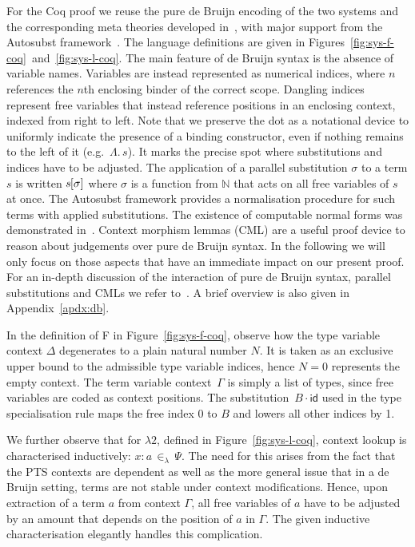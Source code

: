 \documentclass[a4paper,UKenglish]{lipics-v2016}
\newcommand{\ms}{\,}
\newcommand{\mrel}[1]{\mathrel{\ms #1 \ms}}
\newcommand{\Nat}{\mathbb{N}}
\newcommand{\SysL}{$\lambda2$\xspace}
\newcommand{\of}{\ensuremath{\!:\!}}
\newcommand{\inL}{\mrel{\in_{\lambda}}}
\newcommand{\TyLam}{\ensuremath{\Lambda.\,}}
\newcommand{\subst}[1]{\hphantom{|}\!\![{#1}]}
\newcommand{\scons}{\mathbin{\cdot}}
\newcommand{\id}{\mathsf{id}}
\theoremstyle{plain}
\begin{document}
For the Coq proof we reuse the pure de Bruijn encoding of the two systems and the corresponding meta theories developed in~\cite{KaiserEtAl:2017:sysf_pts_equiv_coq}, with major support from the Autosubst framework~\cite{DBLP:conf/itp/SchaferTS15}.
The language definitions are given in Figures~\ref{fig:sys-f-coq}~and~\ref{fig:sys-l-coq}.
The main feature of de Bruijn syntax is the absence of variable names.
Variables are instead represented as numerical indices, where $n$ references the $n$th enclosing binder of the correct scope.
Dangling indices represent free variables that instead reference positions in an enclosing context, indexed from right to left.
Note that we preserve the dot as a notational device to uniformly indicate the presence of a binding constructor, even if nothing remains to the left of it (e.g.\ $\TyLam s$).
It marks the precise spot where substitutions and indices have to be adjusted.
The application of a parallel substitution $\sigma$ to a term $s$ is written $s\subst{\sigma}$ where $\sigma$ is a function from $\Nat$ that acts on all free variables of $s$ at once.
The Autosubst framework provides a normalisation procedure for such terms with applied substitutions.
The existence of computable normal forms was demonstrated in~\cite{SchaeferEtAl:2009:Completeness}.
Context morphism lemmas (CML) are a useful proof device to reason about judgements over pure de Bruijn syntax.
In the following we will only focus on those aspects that have an immediate impact on our present proof.
For an in-depth discussion of the interaction of pure de Bruijn syntax, parallel substitutions and CMLs we refer to~\cite{deBruijn1972, SchaeferEtAl:2009:Completeness, DBLP:conf/itp/SchaferTS15, abadi1991, GoguenMcKinna1997, KaiserEtAl:2017:sysf_pts_equiv_coq}.
A brief overview is also given in Appendix~\ref{apdx:db}.

In the definition of F in Figure~\ref{fig:sys-f-coq}, observe how the type variable context $\Delta$ degenerates to a plain natural number $N$.
It is taken as an exclusive upper bound to the admissible type variable indices, hence $N = 0$ represents the empty context.
The term variable context~$\Gamma$ is simply a list of types, since free variables are coded as context positions.
The \linebreak[2] substitution~$B\scons{\id}$ used in the type specialisation rule maps the free index 0 to $B$ and lowers all other indices by 1.

We further observe that for \SysL, defined in Figure~\ref{fig:sys-l-coq}, context lookup is characterised inductively: $x \of a \inL \Psi$.
The need for this arises from the fact that the PTS contexts are dependent as well as the more general issue that in a de Bruijn setting, terms are not stable under context modifications.
Hence, upon extraction of a term $a$ from context $\Gamma$, all free variables of $a$ have to be adjusted by an amount that depends on the position of $a$ in $\Gamma$.
The given inductive characterisation elegantly handles this complication.
\end{document}

